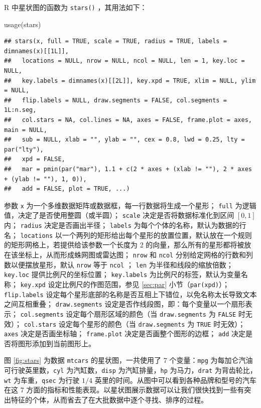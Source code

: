 \documentclass[
  b5paper,
  UTF8,twoside]{book}
\newenvironment{Shaded}{\begin{snugshade}}{\end{snugshade}}
\newcommand{\FunctionTok}[1]{\textcolor[rgb]{0.00,0.00,0.00}{#1}}
\newcommand{\NormalTok}[1]{#1}
\begin{document}
R 中星状图的函数为 \texttt{stars()} ，其用法如下：

\begin{Shaded}
\begin{Highlighting}[]
\FunctionTok{usage}\NormalTok{(stars)}
\end{Highlighting}
\end{Shaded}

\begin{verbatim}
## stars(x, full = TRUE, scale = TRUE, radius = TRUE, labels = dimnames(x)[[1L]],
##   locations = NULL, nrow = NULL, ncol = NULL, len = 1, key.loc = NULL,
##   key.labels = dimnames(x)[[2L]], key.xpd = TRUE, xlim = NULL, ylim = NULL,
##   flip.labels = NULL, draw.segments = FALSE, col.segments = 1L:n.seg,
##   col.stars = NA, col.lines = NA, axes = FALSE, frame.plot = axes, main = NULL,
##   sub = NULL, xlab = "", ylab = "", cex = 0.8, lwd = 0.25, lty = par("lty"),
##   xpd = FALSE,
##   mar = pmin(par("mar"), 1.1 + c(2 * axes + (xlab != ""), 2 * axes + (ylab != ""), 1, 0)),
##   add = FALSE, plot = TRUE, ...)
\end{verbatim}

参数 \texttt{x} 为一个多维数据矩阵或数据框，每一行数据将生成一个星形； \texttt{full} 为逻辑值，决定了是否使用整圆（或半圆）； \texttt{scale} 决定是否将数据标准化到区间 \([0,1]\) 内； \texttt{radius} 决定是否画出半径； \texttt{labels} 为每个个体的名称，默认为数据的行名； \texttt{locations} 以一个两列的矩形给出每个星形的放置位置，默认放在一个规则的矩形网格上，若提供给该参数一个长度为 2 的向量，那么所有的星形都将被放在该坐标上，从而形成蛛网图或雷达图； \texttt{nrow} 和 \texttt{ncol} 分别给定网格的行数和列数以便摆放星形，默认 \texttt{nrow} 等于 \texttt{ncol} ； \texttt{len} 为半径和线段的缩放倍数； \texttt{key.loc} 提供比例尺的坐标位置； \texttt{key.labels} 为比例尺的标签，默认为变量名称； \texttt{key.xpd} 设定比例尺的作图范围，参见 \ref{sec:par} 小节（\texttt{par(\textquotesingle{}xpd\textquotesingle{})}）； \texttt{flip.labels} 设定每个星形底部的名称是否互相上下错位，以免名称太长导致文本之间互相重叠； \texttt{draw.segments} 设定是否作线段图，即：每个变量以一个扇形表示； \texttt{col.segments} 设定每个扇形区域的颜色（当 \texttt{draw.segments} 为 \texttt{FALSE} 时无效）； \texttt{col.stars} 设定每个星形的颜色（当 \texttt{draw.segments} 为 \texttt{TRUE} 时无效）； \texttt{axes} 决定是否画坐标轴； \texttt{frame.plot} 决定是否画整个图形的边框； \texttt{add} 决定是否将图形添加到当前图形上。

图 \ref{fig:stars}
为数据 \texttt{mtcars} 的星状图，一共使用了 7 个变量：\texttt{mpg} 为每加仑汽油可行驶英里数，\texttt{cyl} 为汽缸数，\texttt{disp} 为汽缸排量，\texttt{hp} 为马力，\texttt{drat} 为背齿轮比，\texttt{wt} 为车重，\texttt{qsec} 为行驶 \(1/4\) 英里的时间。从图中可以看到各种品牌和型号的汽车在这 7 方面的指标和性能表现。以星状图展示数据可以让我们很快找到一些有突出特征的个体，从而省去了在大批数据中逐个寻找、排序的过程。
\end{document}
